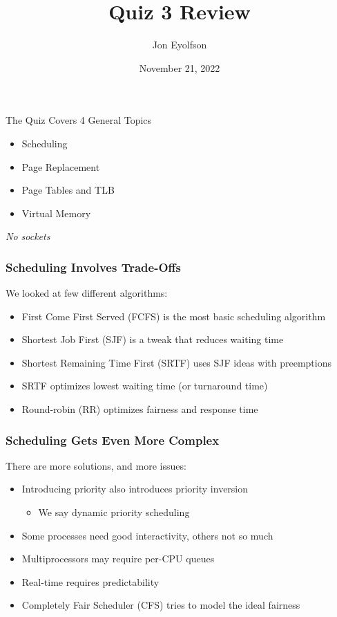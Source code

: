 

\title{Quiz 3 Review}
\author{Jon Eyolfson}
\date{November 21, 2022}


  \begin{frame}
    \titlepage
  \end{frame}

  \begin{frame}{The Quiz Covers 4 General Topics}

    \begin{itemize}
      \item Scheduling
      \item Page Replacement
      \item Page Tables and TLB
      \item Virtual Memory
    \end{itemize}

    \vspace{2em}

    \textit{No sockets}
  \end{frame}

  \begin{frame}
    \frametitle{Scheduling Involves Trade-Offs}

    We looked at few different algorithms:
    \begin{itemize}
      \item First Come First Served (FCFS) is the most basic scheduling algorithm
      \item Shortest Job First (SJF) is a tweak that reduces waiting time
      \item Shortest Remaining Time First (SRTF) uses SJF ideas with preemptions
      \item SRTF optimizes lowest waiting time (or turnaround time)
      \item Round-robin (RR) optimizes fairness and response time
    \end{itemize}
  \end{frame}
  
  \begin{frame}
    \frametitle{Scheduling Gets Even More Complex}

    There are more solutions, and more issues:
    \begin{itemize}
      \item Introducing priority also introduces priority inversion
      \begin{itemize}
        \item We say dynamic priority scheduling
      \end{itemize}
      \item Some processes need good interactivity, others not so much
      \item Multiprocessors may require per-CPU queues
      \item Real-time requires predictability
      \item Completely Fair Scheduler (CFS) tries to model the ideal fairness
    \end{itemize}
  \end{frame}

